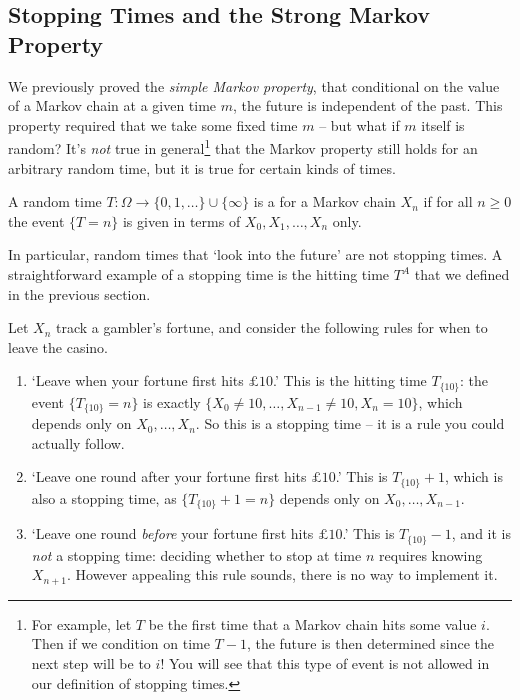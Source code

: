 \subsection{Stopping Times and the Strong Markov Property}

We previously proved the \emph{simple Markov property}, that 
conditional on the value of a Markov chain at a given time $m$, the future is independent of the past.
This property required that we take some fixed time $m$ -- but what if $m$ itself is random? It's \emph{not} true in general\footnote{For example, let $T$ be the first time that a Markov chain hits some value $i$. Then if we condition on time $T - 1$, the future is then determined since the next step will be to $i$! You will see that this type of event is not allowed in our definition of stopping times.} that the Markov property still holds for an arbitrary random time, but it is true for certain kinds of times.

\begin{definition}
	A random time $T : \Omega \rightarrow \{0, 1, \dots\} \cup \{\infty\}$ is a  for a Markov chain $X_n$ if for all $n \geq 0$ the event $\{T = n\}$ is given in terms of $X_0, X_1, \dots, X_n$ only.
\end{definition}

In particular, random times that `look into the future' are not stopping times. A straightforward example of a stopping time is the hitting time $T^A$ that we defined in the previous section.

\begin{example}
	Let $X_n$ track a gambler's fortune, and consider the following rules for when to leave the casino.
	\begin{enumerate}[label=(\roman*)]
		\item `Leave when your fortune first hits $\pounds 10$.' This is the hitting time $T_{\{10\}}$: the event $\{T_{\{10\}} = n\}$ is exactly $\{X_0 \neq 10, \dots, X_{n - 1} \neq 10, X_n = 10\}$, which depends only on $X_0, \dots, X_n$. So this is a stopping time -- it is a rule you could actually follow.
		\item `Leave one round after your fortune first hits $\pounds 10$.' This is $T_{\{10\}} + 1$, which is also a stopping time, as $\{T_{\{10\}} + 1 = n\}$ depends only on $X_0, \dots, X_{n - 1}$.
		\item `Leave one round \emph{before} your fortune first hits $\pounds 10$.' This is $T_{\{10\}} - 1$, and it is \emph{not} a stopping time: deciding whether to stop at time $n$ requires knowing $X_{n + 1}$. However appealing this rule sounds, there is no way to implement it.
	\end{enumerate}
\end{example}

